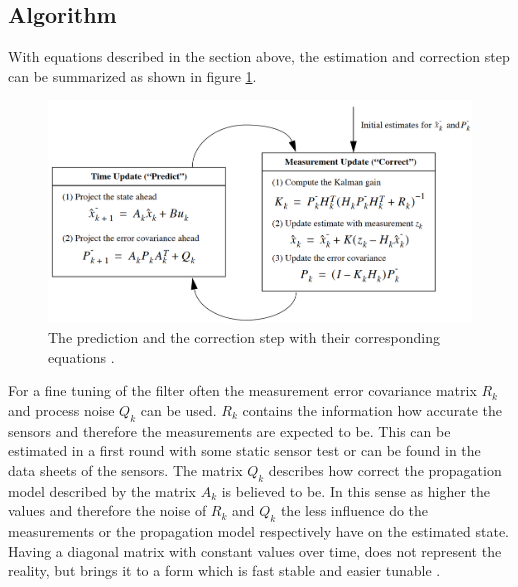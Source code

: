 \subsection*{Algorithm}
With equations described in the section above, the estimation and correction step can be summarized as shown in figure \ref{equation_kalman}.
\begin{figure}[h]
\begin{center}
\includegraphics[width=13cm]{pictures/equation_kalman.png}
\caption{The prediction and the correction step with their corresponding equations \cite{welch1997}. }
\label{equation_kalman}
\end{center}
\end{figure} 
For a fine tuning of the filter often the measurement error covariance matrix $R_k$ and process noise $Q_k$ can be used. $R_k$ contains the information how accurate the sensors and therefore the measurements are expected to be. This can be estimated in a first round with some static sensor test or can be found in the data sheets of the sensors. The matrix $Q_k$ describes how correct the propagation model described by the matrix $A_k$ is believed to be. In this sense as higher the values and therefore the noise of $R_k$ and $Q_k$ the less influence do the measurements or the propagation model respectively have on the estimated state. Having a diagonal matrix with constant values over time, does not represent the reality, but brings it to a form which is fast stable and easier tunable \cite{welch1997}. 

